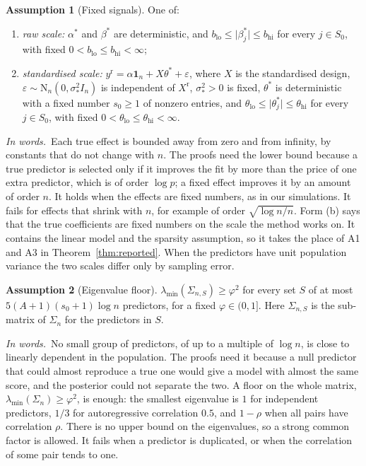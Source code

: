 \documentclass[11pt]{article}
\newcommand{\one}{\mathbf{1}}
\newcommand{\N}{\mathrm{N}}
\newcommand{\abs}[1]{\lvert #1\rvert}
\newcommand{\lmin}{\lambda_{\min}}
\newcommand{\yr}{y^{\mathrm r}}
\newcommand{\Xr}{X^{\mathrm r}}
\newcommand{\bstar}{\beta^*}
\newcommand{\tstar}{\theta^*}
\newcommand{\sigs}{\sigma_*}
\newcommand{\Sz}{S_0}
\newcommand{\sz}{s_0}
\newcommand{\Sig}{\Sigma_n}
\newcommand{\rn}{\sqrt{\log n/n}}
\theoremstyle{plain}
\theoremstyle{definition}
\newtheorem{asm}{Assumption}
\newcommand{\words}{\par\smallskip\noindent\textit{In words.}\ }
\begin{document}
\begin{asm}[Fixed signals]\label{a:fs}
One of:
\begin{enumerate}[label=(\alph*)]
  \item \emph{raw scale:} $\alpha^*$ and $\bstar$ are deterministic, and $b_{\mathrm{lo}}\le\abs{\beta^*_j}\le
    b_{\mathrm{hi}}$ for every $j\in\Sz$, with fixed $0<b_{\mathrm{lo}}\le b_{\mathrm{hi}}<\infty$;
  \item \emph{standardised scale:} $\yr=\alpha\one_n+X\tstar+\varepsilon$, where $X$ is the standardised design,
    $\varepsilon\sim\N_n(0,\sigs^2I_n)$ is independent of $\Xr$, $\sigs^2>0$ is fixed, $\tstar$ is deterministic with a
    fixed number $\sz\ge1$ of nonzero entries, and $\theta_{\mathrm{lo}}\le\abs{\theta^*_j}\le\theta_{\mathrm{hi}}$ for
    every $j\in\Sz$, with fixed $0<\theta_{\mathrm{lo}}\le\theta_{\mathrm{hi}}<\infty$.
\end{enumerate}
\end{asm}
\words Each true effect is bounded away from zero and from infinity, by constants that do not change with $n$. The
proofs need the lower bound because a true predictor is selected only if it improves the fit by more than the price of
one extra predictor, which is of order $\log p$; a fixed effect improves it by an amount of order $n$. It holds when the
effects are fixed numbers, as in our simulations. It fails for effects that shrink with $n$, for example of order $\rn$.
Form (b) says that the true coefficients are fixed numbers on the scale the method works on. It contains the linear
model and the sparsity assumption, so it takes the place of A1 and A3 in Theorem~\ref{thm:reported}. When the
predictors have unit population variance the two scales differ only by sampling error.

\begin{asm}[Eigenvalue floor]\label{a:efs}
$\lmin(\Sigma_{n,S})\ge\varphi^2$ for every set $S$ of at most $5(A+1)(\sz+1)\log n$ predictors, for a fixed
$\varphi\in(0,1]$. Here $\Sigma_{n,S}$ is the sub-matrix of $\Sig$ for the predictors in $S$.
\end{asm}
\words No small group of predictors, of up to a multiple of $\log n$, is close to linearly dependent in the population.
The proofs need it because a null predictor that could almost reproduce a true one would give a model with almost the
same score, and the posterior could not separate the two. A floor on the whole matrix, $\lmin(\Sig)\ge\varphi^2$, is
enough: the smallest eigenvalue is $1$ for independent predictors, $1/3$ for autoregressive correlation $0.5$, and
$1-\rho$ when all pairs have correlation $\rho$. There is no upper bound on the eigenvalues, so a strong common factor
is allowed. It fails when a predictor is duplicated, or when the correlation of some pair tends to one.
\end{document}
